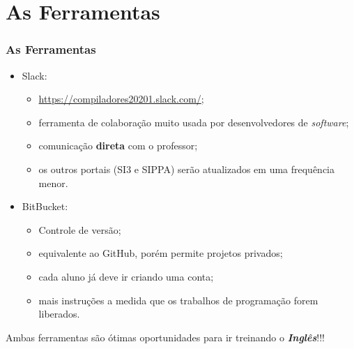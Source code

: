\documentclass[table]{beamer}
\begin{document}
\section{As Ferramentas}
\begin{frame}
   \frametitle{As Ferramentas}
   \begin{itemize}
      \item Slack:
      \begin{itemize}
         \item \url{https://compiladores20201.slack.com/};
	 \item ferramenta de colaboração muito usada por desenvolvedores de \textit{software};
	 \item comunicação \textbf{direta} com o professor;
	 \item os outros portais (SI3 e SIPPA) serão atualizados em uma frequência menor.
      \end{itemize}
      \item BitBucket:
      \begin{itemize}
         \item Controle de versão;
	 \item equivalente ao GitHub, porém permite projetos privados;
	 \item cada aluno já deve ir criando uma conta;
	 \item mais instruções a medida que os trabalhos de programação forem liberados.
      \end{itemize}
   \end{itemize}
   \begin{center}
   Ambas ferramentas são ótimas oportunidades para ir treinando o \textit{\textbf{Inglês}}!!!
   \end{center}
\end{frame}
\end{document}
